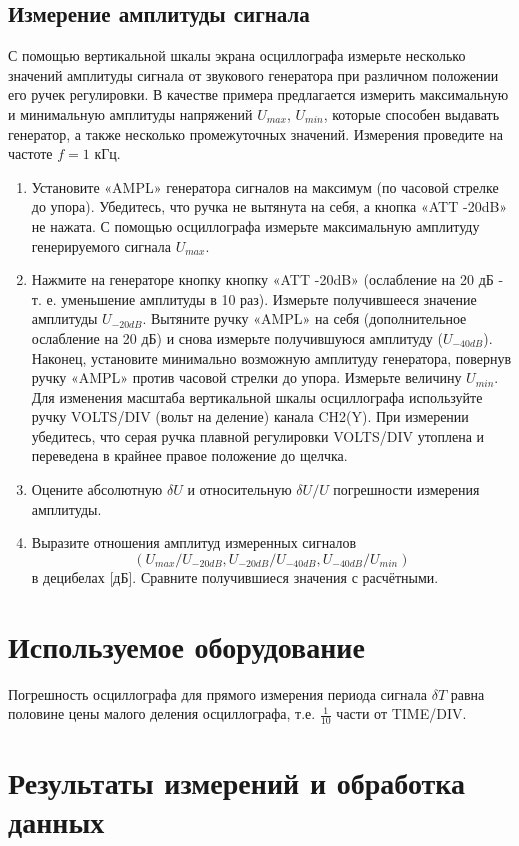 \documentclass[a4paper,12pt]{article} %
\begin{document}
	\subsection{Измерение амплитуды сигнала}
С помощью вертикальной шкалы экрана осциллографа измерьте несколько значений амплитуды сигнала от звукового генератора при различном положении его
ручек регулировки. В качестве примера предлагается измерить максимальную и минимальную амплитуды напряжений $U_{max}$, $U_{min}$, которые способен выдавать генератор, а также несколько промежуточных
значений. Измерения проведите на частоте $f = 1$ кГц.
	\begin{enumerate}
		\item Установите «AMPL» генератора
		сигналов на максимум (по часовой стрелке до упора). Убедитесь,
		что ручка не вытянута на себя, а кнопка «ATT -20dB»
		не нажата. С помощью осциллографа измерьте максимальную амплитуду генерируемого сигнала $U_{max}$.
		\item Нажмите на генераторе кнопку кнопку «ATT -20dB» (ослабление
		на 20 дБ - т. е. уменьшение амплитуды в 10 раз). Измерьте получившееся значение амплитуды $U_{-20dB}$. Вытяните ручку «AMPL» на себя (дополнительное ослабление на 20 дБ) и снова
		измерьте получившуюся амплитуду ($U_{-40dB}$). Наконец, установите минимально возможную амплитуду генератора, повернув ручку «AMPL» против часовой стрелки до упора. Измерьте величину
		$U_{min}$.
		Для изменения масштаба вертикальной шкалы осциллографа используйте ручку VOLTS/DIV (вольт на деление) канала
		CH2(Y). При измерении убедитесь, что серая ручка плавной регулировки VOLTS/DIV утоплена и переведена в крайнее правое
		положение до щелчка.
		\item Оцените абсолютную $\delta U$ и относительную $\delta U/U$ погрешности измерения амплитуды.
		\item Выразите отношения амплитуд измеренных сигналов
		\[(U_{max}/U_{-20dB}, U_{-20dB}/U_{-40dB}, U_{-40dB}/U_{min})\] в децибелах [дБ].
		Сравните получившиеся значения с расчётными.
	\end{enumerate}
	\section{Используемое оборудование}
	Погрешность осциллографа для прямого измерения периода сигнала $ \delta T $ равна половине цены малого деления осциллографа, т.е. $ \frac{1}{10} $ части от TIME/DIV.

	\section{Результаты измерений и обработка данных}
	
\end{document}
